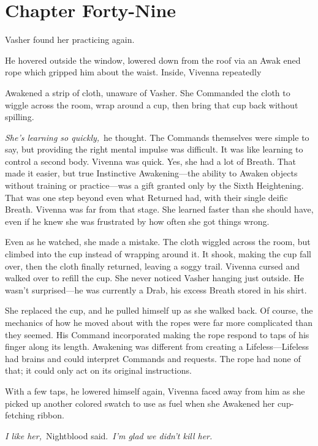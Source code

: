 \section{Chapter Forty-Nine}

Vasher found her practicing again.

He hovered outside the window, lowered down from the roof via an Awak ened rope which gripped him about the waist. Inside, Vivenna repeatedly

Awakened a strip of cloth, unaware of Vasher. She Commanded the cloth to wiggle across the room, wrap around a cup, then bring that cup back without spilling.

\textit{She’s learning so quickly,}~he thought. The Commands themselves were simple to say, but providing the right mental impulse was difficult. It was like learning to control a second body. Vivenna was quick. Yes, she had a lot of Breath. That made it easier, but true Instinctive Awakening—the ability to Awaken objects without training or practice—was a gift granted only by the Sixth Heightening. That was one step beyond even what Returned had, with their single deific Breath. Vivenna was far from that stage. She learned faster than she should have, even if he knew she was frustrated by how often she got things wrong.

Even as he watched, she made a mistake. The cloth wiggled across the room, but climbed into the cup instead of wrapping around it. It shook, making the cup fall over, then the cloth finally returned, leaving a soggy trail. Vivenna cursed and walked over to refill the cup. She never noticed Vasher hanging just outside. He wasn’t surprised—he was currently a Drab, his excess Breath stored in his shirt.

She replaced the cup, and he pulled himself up as she walked back. Of course, the mechanics of how he moved about with the ropes were far more complicated than they seemed. His Command incorporated making the rope respond to taps of his finger along its length. Awakening was different from creating a Lifeless—Lifeless had brains and could interpret Commands and requests. The rope had none of that; it could only act on its original instructions.

With a few taps, he lowered himself again, Vivenna faced away from him as she picked up another colored swatch to use as fuel when she Awakened her cup-fetching ribbon.

\textit{I like her,}~Nightblood said.~\textit{I’m glad we didn’t kill her.}

